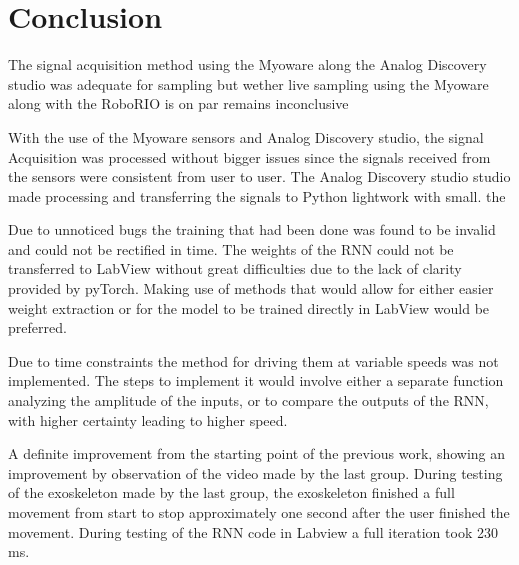 \section{Conclusion}

The signal acquisition method using the Myoware along the Analog Discovery studio was adequate for sampling but wether live sampling using the Myoware along with the RoboRIO is on par remains inconclusive 


With the use of the Myoware sensors and Analog Discovery studio, the signal Acquisition was processed without bigger issues since the signals received from the sensors were consistent from user to user. 
The Analog Discovery studio studio made processing and transferring the signals to Python lightwork with small. the 

Due to unnoticed bugs the training that had been done was found to be invalid and could not be rectified in time.
The
weights of the RNN could not be transferred to LabView without great difficulties due to the lack of clarity provided by
pyTorch. Making use of methods that would allow for either easier weight extraction or for the model to be trained
directly in LabView would be preferred.


Due to time constraints the method for driving them at variable speeds was not implemented. The steps to implement it
would involve either a separate function analyzing the amplitude of the inputs, or to compare the outputs of the RNN,
with higher certainty leading to higher speed.


A definite improvement from the starting point of the previous work, showing an improvement by observation of the video made by the last group. During testing of the exoskeleton made by the last group,
the exoskeleton finished a full movement from start to stop approximately one second after the user finished the movement. During testing of the RNN code in Labview a full iteration took 230 ms.


